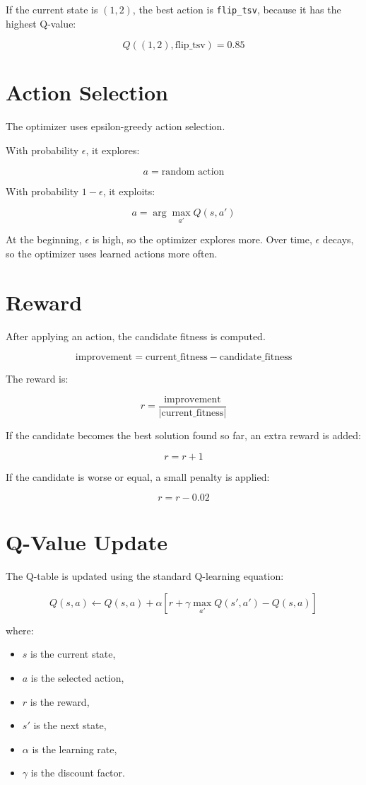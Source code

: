 \documentclass[11pt]{article}
\begin{document}
If the current state is $(1,2)$, the best action is \texttt{flip\_tsv}, because
it has the highest Q-value:

\[
Q((1,2), \text{flip\_tsv}) = 0.85
\]

\section{Action Selection}

The optimizer uses epsilon-greedy action selection.

With probability $\epsilon$, it explores:

\[
a = \text{random action}
\]

With probability $1-\epsilon$, it exploits:

\[
a =
\arg\max_{a'} Q(s,a')
\]

At the beginning, $\epsilon$ is high, so the optimizer explores more. Over time,
$\epsilon$ decays, so the optimizer uses learned actions more often.

\section{Reward}

After applying an action, the candidate fitness is computed.

\[
\text{improvement}
=
\text{current\_fitness} - \text{candidate\_fitness}
\]

The reward is:

\[
r =
\frac{\text{improvement}}
{|\text{current\_fitness}|}
\]

If the candidate becomes the best solution found so far, an extra reward is
added:

\[
r = r + 1
\]

If the candidate is worse or equal, a small penalty is applied:

\[
r = r - 0.02
\]

\section{Q-Value Update}

The Q-table is updated using the standard Q-learning equation:

\[
Q(s,a)
\leftarrow
Q(s,a)
 +
\alpha
\left[
r
 +
\gamma \max_{a'} Q(s',a')
 -
Q(s,a)
\right]
\]

where:

\begin{itemize}[noitemsep]
    \item $s$ is the current state,
    \item $a$ is the selected action,
    \item $r$ is the reward,
    \item $s'$ is the next state,
    \item $\alpha$ is the learning rate,
    \item $\gamma$ is the discount factor.
\end{itemize}
\end{document}
